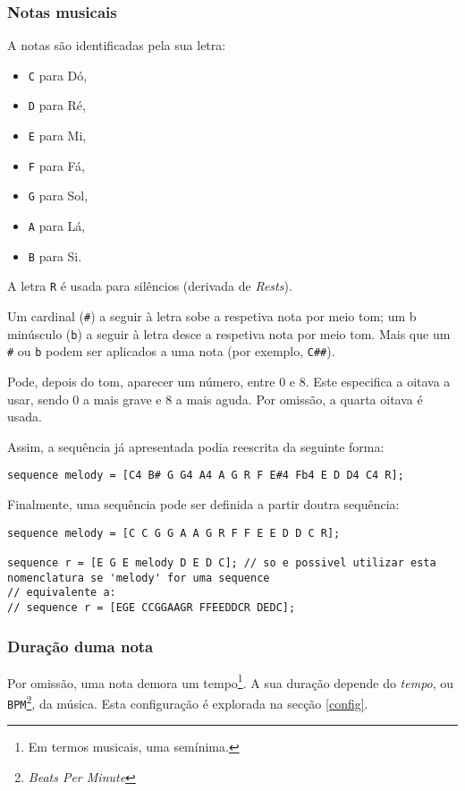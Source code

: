 \documentclass{article}
\begin{document}
\subsubsection{Notas musicais}
A notas são identificadas pela sua letra:
\begin{itemize}
    \item \texttt{C} para Dó,
    \item \texttt{D} para Ré,
    \item \texttt{E} para Mi,
    \item \texttt{F} para Fá,
    \item \texttt{G} para Sol,
    \item \texttt{A} para Lá,
    \item \texttt{B} para Si.
\end{itemize}
A letra \texttt{R} é usada para silêncios (derivada de \textit{Rests}).

Um cardinal (\texttt{\#}) a seguir à letra sobe a respetiva nota por meio tom; um b minúsculo (\texttt{b}) a seguir à letra desce a respetiva nota por meio tom. Mais que um \texttt{\#} ou \texttt{b} podem ser aplicados a uma nota (por exemplo, \texttt{C\#\#}).

Pode, depois do tom, aparecer um número, entre 0 e 8. Este especifica a oitava a usar, sendo 0 a mais grave e 8 a mais aguda. Por omissão, a quarta oitava é usada.

Assim, a sequência já apresentada podia reescrita da seguinte forma:
\begin{lstlisting} 
sequence melody = [C4 B# G G4 A4 A G R F E#4 Fb4 E D D4 C4 R];
\end{lstlisting}

Finalmente, uma sequência pode ser definida a partir doutra sequência:
\begin{lstlisting} 
sequence melody = [C C G G A A G R F F E E D D C R];

sequence r = [E G E melody D E D C]; // so e possivel utilizar esta nomenclatura se 'melody' for uma sequence
// equivalente a:
// sequence r = [EGE CCGGAAGR FFEEDDCR DEDC];
\end{lstlisting}


\subsubsection{Duração duma nota}
Por omissão, uma nota demora um tempo\footnote{Em termos musicais, uma semínima.}. A sua duração depende do \textit{tempo}, ou \texttt{BPM}\footnote{\textit{Beats Per Minute}}, da música. Esta configuração é explorada na secção \ref{config}.
\end{document}
